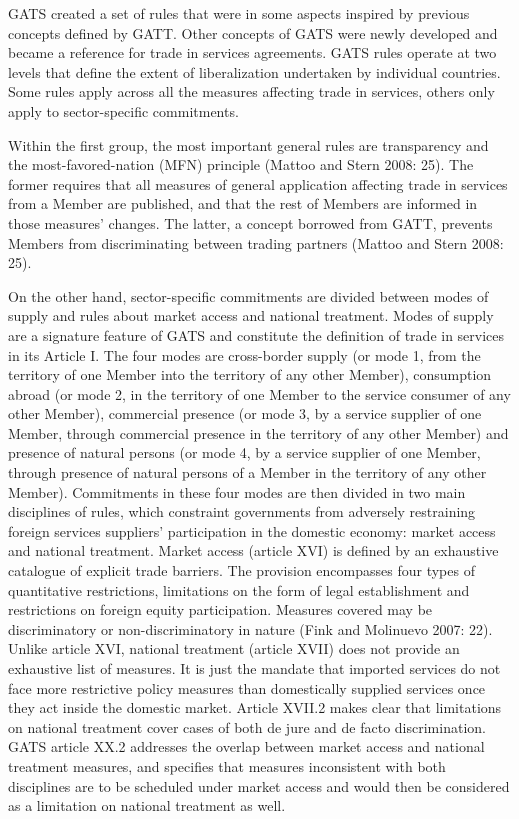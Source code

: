 \documentclass{article}
\begin{document}
\smallskip

GATS created a set of rules that were in some aspects inspired by previous concepts defined by GATT. Other concepts of GATS were newly developed and became a reference for trade in services agreements. GATS rules operate at two levels that define the extent of liberalization undertaken by individual countries. Some rules apply across all the measures affecting trade in services, others only apply to sector-specific commitments.

\smallskip

Within the first group, the most important general rules are transparency and the most-favored-nation (MFN) principle (Mattoo and Stern 2008: 25). The former requires that all measures of general application affecting trade in services from a Member are published, and that the rest of Members are informed in those measures’ changes. The latter, a concept borrowed from GATT, prevents Members from discriminating between trading partners (Mattoo and Stern 2008: 25).

\smallskip

On the other hand, sector-specific commitments are divided between modes of supply and rules about market access and national treatment. Modes of supply are a signature feature of GATS and constitute the definition of trade in services in its Article I. The four modes are cross-border supply (or mode 1, from the territory of one Member into the territory of any other Member), consumption abroad (or mode 2, in the territory of one Member to the service consumer of any other Member), commercial presence (or mode 3, by a service supplier of one Member, through commercial presence in the territory of any other Member) and presence of natural persons (or mode 4, by a service supplier of one Member, through presence of natural persons of a Member in the territory of any other Member). Commitments in these four modes are then divided in two main disciplines of rules, which constraint governments from adversely restraining foreign services suppliers’ participation in the domestic economy: market access and national treatment. Market access (article XVI) is defined by an exhaustive catalogue of explicit trade barriers. The provision encompasses four types of quantitative restrictions, limitations on the form of legal establishment and restrictions on foreign equity participation. Measures covered may be discriminatory or non-discriminatory in nature (Fink and Molinuevo 2007: 22). Unlike article XVI, national treatment (article XVII) does not provide an exhaustive list of measures. It is just the mandate that imported services do not face more restrictive policy measures than domestically supplied services once they act inside the domestic market. Article XVII.2 makes clear that limitations on national treatment cover cases of both de jure and de facto discrimination. GATS article XX.2 addresses the overlap between market access and national treatment measures, and specifies that measures inconsistent with both disciplines are to be scheduled under market access and would then be considered as a limitation on national treatment as well.
\end{document}
